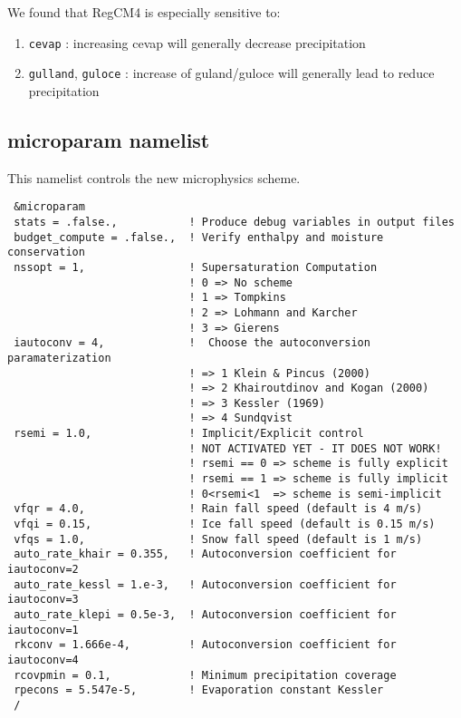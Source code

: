 We found that RegCM4 is especially sensitive to:

\begin{enumerate}
\item \verb=cevap= : increasing cevap will generally decrease precipitation
\item \verb=gulland=, \verb=guloce= : increase of guland/guloce will generally
lead to reduce precipitation
\end{enumerate}

\subsection{microparam namelist}

This namelist controls the new microphysics scheme.

{\footnotesize
\begin{Verbatim}
 &microparam
 stats = .false.,           ! Produce debug variables in output files
 budget_compute = .false.,  ! Verify enthalpy and moisture conservation
 nssopt = 1,                ! Supersaturation Computation
                            ! 0 => No scheme
                            ! 1 => Tompkins
                            ! 2 => Lohmann and Karcher
                            ! 3 => Gierens
 iautoconv = 4,             !  Choose the autoconversion paramaterization
                            ! => 1 Klein & Pincus (2000)
                            ! => 2 Khairoutdinov and Kogan (2000)
                            ! => 3 Kessler (1969)
                            ! => 4 Sundqvist
 rsemi = 1.0,               ! Implicit/Explicit control 
                            ! NOT ACTIVATED YET - IT DOES NOT WORK!
                            ! rsemi == 0 => scheme is fully explicit
                            ! rsemi == 1 => scheme is fully implicit
                            ! 0<rsemi<1  => scheme is semi-implicit
 vfqr = 4.0,                ! Rain fall speed (default is 4 m/s)
 vfqi = 0.15,               ! Ice fall speed (default is 0.15 m/s)
 vfqs = 1.0,                ! Snow fall speed (default is 1 m/s)
 auto_rate_khair = 0.355,   ! Autoconversion coefficient for iautoconv=2
 auto_rate_kessl = 1.e-3,   ! Autoconversion coefficient for iautoconv=3
 auto_rate_klepi = 0.5e-3,  ! Autoconversion coefficient for iautoconv=1
 rkconv = 1.666e-4,         ! Autoconversion coefficient for iautoconv=4
 rcovpmin = 0.1,            ! Minimum precipitation coverage
 rpecons = 5.547e-5,        ! Evaporation constant Kessler
 /
\end{Verbatim}
}


